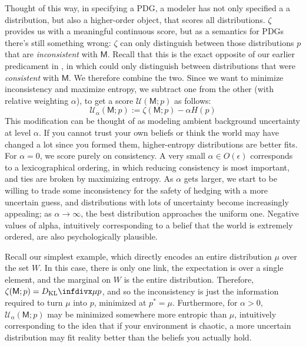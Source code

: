 \documentclass{article}
\newcommand{\sfM}{\mathsf M}
\newcommand{\MN}{PDG}
\newcommand{\MNs}{\MN s}
\numberwithin{equation}{section}
\begin{document}
\begin{notfocus}
	Thought of this way, in specifying a \MN, a modeler has not only specified a a distribution, but also a higher-order object, that scores all distributions. 
	$\zeta$ provides us with a meaningful continuous score, but as a semantics for \MNs\, there's still something wrong: $\zeta$ can only distinguish between those distributions $p$ that are \emph{inconsistent} with $\sfM$. 
	Recall that this is the exact opposite of our earlier predicament in , in which could only distinguish between distributions that were \emph{consistent} with $\sfM$. We therefore combine the two. Since we want to minimize inconsistency and maximize entropy, we subtract one from the other (with relative weighting $\alpha$), to get a score $\mathcal U(\sfM; p)$ as follows:
	\begin{equation}
		\mathcal U_\alpha(\sfM; p) := \zeta(\sfM;p) - \alpha H(p) \label{eq:freeenergy-weighted}
	\end{equation} 
	This modification can be thought of as modeling ambient background uncertainty at level $\alpha$. 
	If you cannot trust your own beliefs or think the world may have changed a lot since you formed them, higher-entropy distributions are better fits.	
	For $\alpha = 0$, we score purely on consistency. A very small $\alpha \in O(\epsilon)$ corresponds to a lexicographical ordering, in which reducing consistency is most important, and ties are broken by maximizing entropy. 
	As $\alpha$ gets larger, we start to be willing to trade some inconsistency for the safety of hedging with a more uncertain guess, and distributions with lots of uncertainty become increasingly appealing; as $\alpha \to \infty$, the best distribution approaches the uniform one. Negative values of alpha, intuitively corresponding to a belief that the world is extremely ordered, are also psychologically plausible. 
	
	

	
	\begin{example}[continues=ex:worldsonly]
		Recall our simplest example, which directly encodes an entire distribution $\mu$ over the set $W$. 
		In this case, there is only one link, the expectation is over a single element, and the marginal on $W$ is the entire distribution. Therefore, $\zeta(\sfM; p) = \kldiv{\mu}{p}$, and so the inconsistency is just the information required to turn $\mu$ into $p$, minimized at $p^* = \mu$. Furthermore, for $\alpha > 0$, $\mathcal U_\alpha (\sfM; p)$ may be minimized somewhere more entropic than $\mu$, intuitively corresponding to the idea that if your environment is chaotic, a more uncertain distribution may fit reality better than the beliefs you actually hold.
	\end{example}
		

\end{notfocus}
\end{document}
